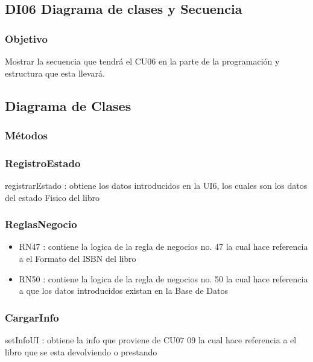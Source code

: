 \newpage
\subsection{DI06 Diagrama de clases y Secuencia}
\subsubsection{Objetivo}
Mostrar la secuencia que tendrá el CU06 en la parte de la programación y estructura que esta llevará.
\subsection{Diagrama de Clases}	
\subsubsection{Métodos}

\subsubsection{RegistroEstado}
	\begin{Citemize}
		\item registrarEstado : obtiene los datos introducidos en la UI6, los cuales son los datos del estado Fisico del libro 
	\end{Citemize}

\subsubsection{ReglasNegocio}
\begin{itemize}
	\item RN47 : contiene la logica de la regla de negocios no. 47 la cual hace referencia a el Formato del ISBN del libro
	\item RN50 : contiene la logica de la regla de negocios no. 50 la cual hace referencia a que los datos introducidos existan en la Base de Datos
\end{itemize}

\subsubsection{CargarInfo}
	\begin{Citemize}
		\item setInfoUI : obtiene la info que proviene de CU07 09 la cual hace referencia a el libro que se esta devolviendo o prestando
	\end{Citemize}
	
